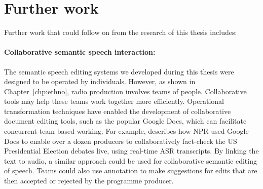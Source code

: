 











\section{Further work}\label{sec:conclusions-further}

Further work that could follow on from the research of this thesis includes:

\paragraph{Collaborative semantic speech interaction:}

The semantic speech editing systems we developed during this thesis were designed to be operated by individuals.
However, as shown in Chapter~\ref{chp:ethno}, radio production involves teams of people.  Collaborative tools may help
these teams work together more efficiently.  Operational transformation techniques \citep{Sun2004} have enabled the
development of collaborative document editing tools, such as the popular Google Docs, which can facilitate concurrent
team-based working.  For example, \citet{Fisher2016} describes how NPR used Google Docs to enable over a dozen
producers to collaboratively fact-check the US Presidential Election debates live, using real-time ASR transcripts. By
linking the text to audio, a similar approach could be used for collaborative semantic editing of speech. Teams could
also use annotation to make suggestions for edits that are then accepted or rejected by the programme producer.

